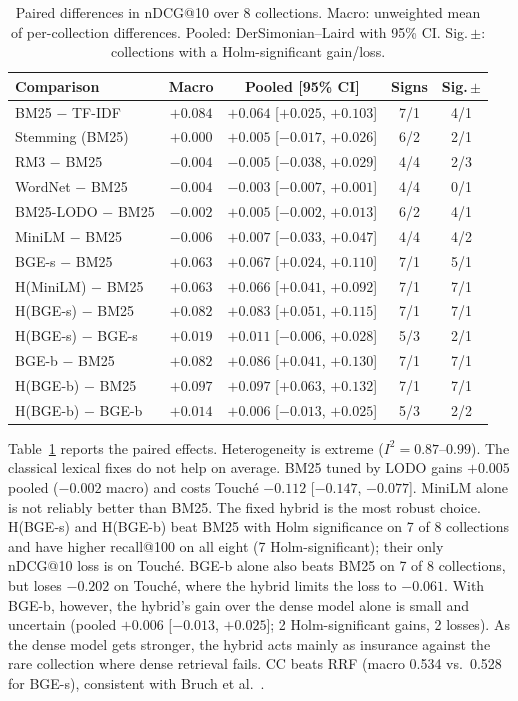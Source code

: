 \documentclass[conference]{IEEEtran}
\makeatletter
\newcommand{\Hy}{\textsc{H}}
\newcommand{\ndcg}{nDCG@10}
\makeatother
\begin{document}
\begin{table}[t]
\centering
\caption{Paired differences in \ndcg{} over 8 collections. Macro: unweighted mean of per-collection differences. Pooled: DerSimonian--Laird with 95\% CI. Sig.\,$\pm$: collections with a Holm-significant gain/loss.}
\label{tab:effects}
\footnotesize
\setlength{\tabcolsep}{2pt}
\begin{tabular}{@{}lcccc@{}}
\toprule
Comparison & Macro & Pooled [95\% CI] & Signs & Sig.\,$\pm$ \\
\midrule
BM25 $-$ TF-IDF        & $+0.084$ & $+0.064$ [$+0.025$, $+0.103$] & 7/1 & 4/1 \\
Stemming (BM25)        & $+0.000$ & $+0.005$ [$-0.017$, $+0.026$] & 6/2 & 2/1 \\
RM3 $-$ BM25           & $-0.004$ & $-0.005$ [$-0.038$, $+0.029$] & 4/4 & 2/3 \\
WordNet $-$ BM25       & $-0.004$ & $-0.003$ [$-0.007$, $+0.001$] & 4/4 & 0/1 \\
BM25-LODO $-$ BM25     & $-0.002$ & $+0.005$ [$-0.002$, $+0.013$] & 6/2 & 4/1 \\
MiniLM $-$ BM25        & $-0.006$ & $+0.007$ [$-0.033$, $+0.047$] & 4/4 & 4/2 \\
BGE-s $-$ BM25         & $+0.063$ & $+0.067$ [$+0.024$, $+0.110$] & 7/1 & 5/1 \\
\Hy(MiniLM) $-$ BM25   & $+0.063$ & $+0.066$ [$+0.041$, $+0.092$] & 7/1 & 7/1 \\
\Hy(BGE-s) $-$ BM25    & $+0.082$ & $+0.083$ [$+0.051$, $+0.115$] & 7/1 & 7/1 \\
\Hy(BGE-s) $-$ BGE-s   & $+0.019$ & $+0.011$ [$-0.006$, $+0.028$] & 5/3 & 2/1 \\
BGE-b $-$ BM25         & $+0.082$ & $+0.086$ [$+0.041$, $+0.130$] & 7/1 & 7/1 \\
\Hy(BGE-b) $-$ BM25    & $+0.097$ & $+0.097$ [$+0.063$, $+0.132$] & 7/1 & 7/1 \\
\Hy(BGE-b) $-$ BGE-b   & $+0.014$ & $+0.006$ [$-0.013$, $+0.025$] & 5/3 & 2/2 \\
\bottomrule
\end{tabular}
\end{table}

Table~\ref{tab:effects} reports the paired effects. Heterogeneity is extreme ($I^2=0.87$--$0.99$). The classical lexical fixes do not help on average. BM25 tuned by LODO gains $+0.005$ pooled ($-0.002$ macro) and costs Touch\'e $-0.112$ [$-0.147$, $-0.077$]. MiniLM alone is not reliably better than BM25. The fixed hybrid is the most robust choice. \Hy(BGE-s) and \Hy(BGE-b) beat BM25 with Holm significance on 7 of 8 collections and have higher recall@100 on all eight (7 Holm-significant); their only \ndcg{} loss is on Touch\'e. BGE-b alone also beats BM25 on 7 of 8 collections, but loses $-0.202$ on Touch\'e, where the hybrid limits the loss to $-0.061$. With BGE-b, however, the hybrid's gain over the dense model alone is small and uncertain (pooled $+0.006$ [$-0.013$, $+0.025$]; 2 Holm-significant gains, 2 losses). As the dense model gets stronger, the hybrid acts mainly as insurance against the rare collection where dense retrieval fails. CC beats RRF (macro 0.534 vs.\ 0.528 for BGE-s), consistent with Bruch et al.~\cite{bruch2024fusion}.
\end{document}
